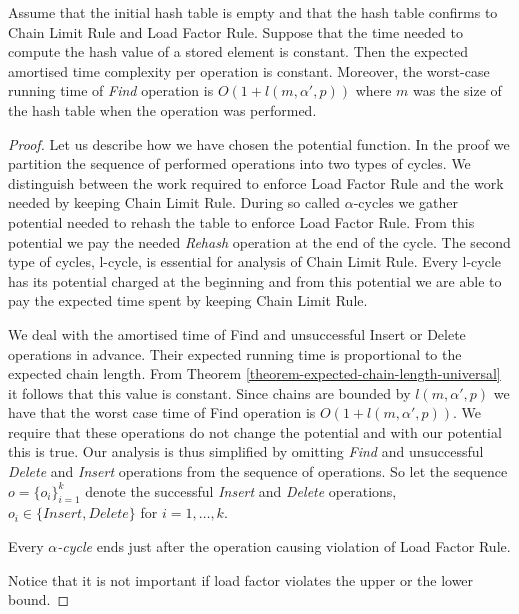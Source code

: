 \begin{theorem}
\label{theorem-delete-time}
Assume that the initial hash table is empty and that the hash table confirms to Chain Limit Rule and Load Factor Rule. Suppose that the time needed to compute the hash value of a stored element is constant. Then the expected amortised time complexity per operation is constant. Moreover, the worst-case running time of \emph{Find} operation is $O(1 + l(m, \alpha', p))$ where $m$ was the size of the hash table when the operation was performed.
\end{theorem}
\begin{proof}
Let us describe how we have chosen the potential function. In the proof we partition the sequence of performed operations into two types of cycles. We distinguish between the work required to enforce Load Factor Rule and the work needed by keeping Chain Limit Rule. During so called $\alpha$-cycles we gather potential needed to rehash the table to enforce Load Factor Rule. From this potential we pay the needed \emph{Rehash} operation at the end of the cycle. The second type of cycles, l-cycle, is essential for analysis of Chain Limit Rule. Every l-cycle has its potential charged at the beginning and from this potential we are able to pay the expected time spent by keeping Chain Limit Rule.

We deal with the amortised time of Find and unsuccessful Insert or Delete operations in advance. Their expected running time is proportional to the expected chain length. From Theorem \ref{theorem-expected-chain-length-universal} it follows that this value is constant. Since chains are bounded by $l(m, \alpha', p)$ we have that the worst case time of Find operation is $O(1 + l(m, \alpha', p))$. We require that these operations do not change the potential and with our potential this is true. Our analysis is thus simplified by omitting \emph{Find} and unsuccessful \emph{Delete} and \emph{Insert} operations from the sequence of operations. So let the sequence $o = \{o_i\}_{i=1}^{k}$ denote the successful \emph{Insert} and \emph{Delete} operations, $o_i \in \{Insert, Delete\}$ for $i = 1, \dots, k$.

\begin{definition}
Every \emph{$\alpha$-cycle} ends just after the operation causing violation of Load Factor Rule.
\end{definition}
Notice that it is not important if load factor violates the upper or the lower bound.


\end{proof}
